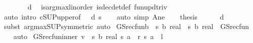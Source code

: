 \begin{isabellebody}
\ \ \ \ \ \ \isamarkupfalse%
\ d\ \isamarkupfalse%
\ is{\isacharunderscore}{\kern0pt}arg{\isacharunderscore}{\kern0pt}max{\isacharunderscore}{\kern0pt}linorder\ is{\isacharunderscore}{\kern0pt}dec{\isacharunderscore}{\kern0pt}det{\isacharunderscore}{\kern0pt}def\ fun{\isacharunderscore}{\kern0pt}upd{\isacharunderscore}{\kern0pt}triv\isanewline
\ \ \ \ \ \ \isamarkupfalse%
\ {\isacharparenleft}{\kern0pt}auto\ intro{\isacharbang}{\kern0pt}{\isacharcolon}{\kern0pt}\ cSUP{\isacharunderscore}{\kern0pt}upper{}{\isacharbrackleft}{\kern0pt}of\ {\isacharunderscore}{\kern0pt}\ {\isacharunderscore}{\kern0pt}\ {\isachardoublequoteopen}d\ s{\isachardoublequoteclose}{\isacharbrackright}{\kern0pt}{\isacharparenright}{\kern0pt}\isanewline
\ \ \isamarkupfalse%
\ {\isacharparenleft}{\kern0pt}auto\ simp{\isacharcolon}{\kern0pt}\ A{\isacharunderscore}{\kern0pt}ne{\isacharparenright}{\kern0pt}\isanewline
\ \ \isamarkupfalse%
\ {\isacharquery}{\kern0pt}thesis\isanewline
\ \ \ \ \isamarkupfalse%
\ d\isanewline
\ \ \ \ \isamarkupfalse%
\ {\isacharparenleft}{\kern0pt}subst\ arg{\isacharunderscore}{\kern0pt}max{\isacharunderscore}{\kern0pt}SUP{\isacharbrackleft}{\kern0pt}symmetric{\isacharbrackright}{\kern0pt}{\isacharparenright}{\kern0pt}\ auto\isanewline
{}\isamarkupfalse%
%
\endisatagproof
{\isafoldproof}%
%
\isadelimproof
\isanewline
%
\endisadelimproof
\isanewline
\isanewline
{}\isamarkupfalse%
\ GS{\isacharunderscore}{\kern0pt}rec{\isacharunderscore}{\kern0pt}fun\isactrlsub b\ {\isacharcolon}{\kern0pt}{\isacharcolon}{\kern0pt}\ {\isachardoublequoteopen}{\isacharparenleft}{\kern0pt}{\isacharprime}{\kern0pt}s\ {\isasymRightarrow}\isactrlsub b\ real{\isacharparenright}{\kern0pt}\ {\isasymRightarrow}\ {\isacharparenleft}{\kern0pt}{\isacharprime}{\kern0pt}s\ {\isasymRightarrow}\isactrlsub b\ real{\isacharparenright}{\kern0pt}{\isachardoublequoteclose}\ \ GS{\isacharunderscore}{\kern0pt}rec{\isacharunderscore}{\kern0pt}fun\isanewline
%
\isadelimproof
\ \ %
\endisadelimproof
%
\isatagproof
{}\isamarkupfalse%
\ auto%
\endisatagproof
{\isafoldproof}%
%
\isadelimproof
\isanewline
%
\endisadelimproof
\isanewline
{}\isamarkupfalse%
\ {\isachardoublequoteopen}GS{\isacharunderscore}{\kern0pt}rec{\isacharunderscore}{\kern0pt}fun{\isacharunderscore}{\kern0pt}inner\ {\isacharparenleft}{\kern0pt}v\ {\isacharcolon}{\kern0pt}{\isacharcolon}{\kern0pt}\ {\isacharprime}{\kern0pt}s\ {\isasymRightarrow}\isactrlsub b\ real{\isacharparenright}{\kern0pt}\ s\ a\ {\isasymequiv}\ r\ {\isacharparenleft}{\kern0pt}s{\isacharcomma}{\kern0pt}\ a{\isacharparenright}{\kern0pt}\ {\isacharplus}{\kern0pt}\ l\ {\isacharasterisk}{\kern0pt}\ {\isacharparenleft}{\kern0pt}\isanewline

\end{isabellebody}
